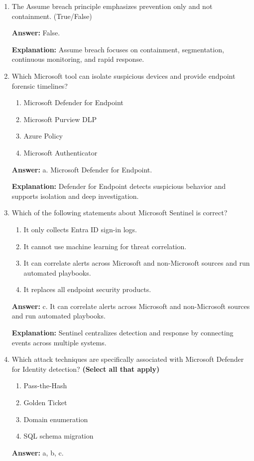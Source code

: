 \documentclass[10pt]{article}
\begin{document}
\begin{enumerate}[leftmargin=*]
\textbf{Explanation:} PIM reduces standing privilege by elevating access only for approved, time-bound tasks.

\item The Assume breach principle emphasizes prevention only and not containment. (True/False)

\textbf{Answer:} False.

\textbf{Explanation:} Assume breach focuses on containment, segmentation, continuous monitoring, and rapid response.

\item Which Microsoft tool can isolate suspicious devices and provide endpoint forensic timelines?
\begin{enumerate}[label=\alph*., leftmargin=1.5em]
\item Microsoft Defender for Endpoint
\item Microsoft Purview DLP
\item Azure Policy
\item Microsoft Authenticator
\end{enumerate}
\textbf{Answer:} a. Microsoft Defender for Endpoint.

\textbf{Explanation:} Defender for Endpoint detects suspicious behavior and supports isolation and deep investigation.

\item Which of the following statements about Microsoft Sentinel is correct?
\begin{enumerate}[label=\alph*., leftmargin=1.5em]
\item It only collects Entra ID sign-in logs.
\item It cannot use machine learning for threat correlation.
\item It can correlate alerts across Microsoft and non-Microsoft sources and run automated playbooks.
\item It replaces all endpoint security products.
\end{enumerate}
\textbf{Answer:} c. It can correlate alerts across Microsoft and non-Microsoft sources and run automated playbooks.

\textbf{Explanation:} Sentinel centralizes detection and response by connecting events across multiple systems.

\item Which attack techniques are specifically associated with Microsoft Defender for Identity detection? \textbf{(Select all that apply)}
\begin{enumerate}[label=\alph*., leftmargin=1.5em]
\item Pass-the-Hash
\item Golden Ticket
\item Domain enumeration
\item SQL schema migration
\end{enumerate}
\textbf{Answer:} a, b, c.


\end{enumerate}
\end{document}
